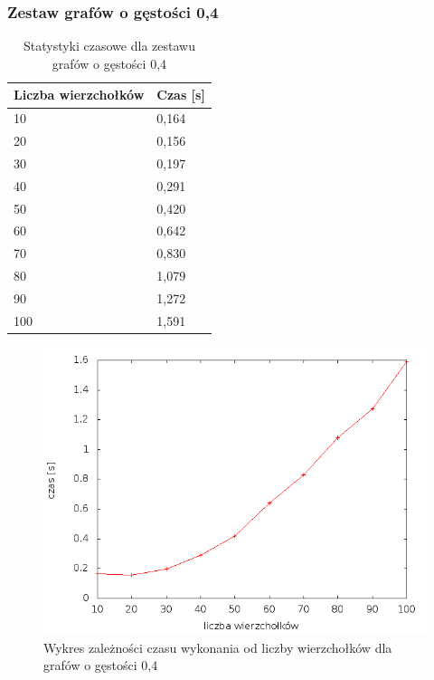 \documentclass[12pt, a4paper]{article}
\begin{document}
\subsubsection*{Zestaw grafów o gęstości 0,4}
\begin{table}[H]
\caption{Statystyki czasowe dla zestawu grafów o gęstości 0,4}
\begin{center}
    \begin{tabular}{|l|l|}
    \hline
    Liczba wierzchołków & Czas [s] \\ \hline
    10 & 0,164 \\ \hline
    20 & 0,156 \\ \hline
    30 & 0,197 \\ \hline
    40 & 0,291 \\ \hline
    50 & 0,420 \\ \hline
    60 & 0,642 \\ \hline
    70 & 0,830 \\ \hline
    80 & 1,079 \\ \hline
    90 & 1,272 \\ \hline
    100 & 1,591 \\ \hline
    \end{tabular}
\end{center}
\end{table}

\begin{figure}[h]
    \begin{center}
	\includegraphics[scale=0.5]{results/img/den/den_04.png}
	\caption{Wykres zależności czasu wykonania od liczby wierzchołków dla grafów o gęstości 0,4}
    \end{center}
\end{figure}
\end{document}
